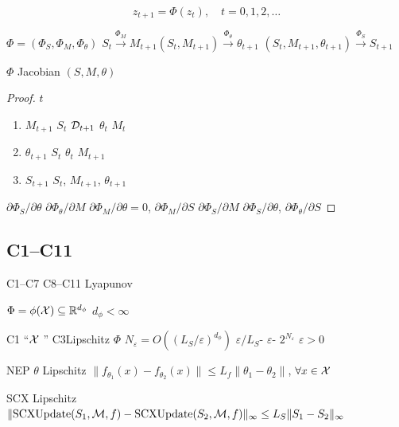 \begin{equation}\label{eq:dynamics}
    z_{t+1} = \Phi(z_t), \quad t = 0, 1, 2, \dots
\end{equation}

 $\Phi = (\Phi_S, \Phi_M, \Phi_\theta)$ 
$S_t \xrightarrow{\Phi_M} M_{t+1}$$(S_t, M_{t+1}) \xrightarrow{\Phi_\theta} \theta_{t+1}$ $(S_t, M_{t+1}, \theta_{t+1}) \xrightarrow{\Phi_S} S_{t+1}$

\begin{proposition}[ Jacobian]\label{prop:causal}
$\Phi$  Jacobian $(S, M, \theta)$ 
\end{proposition}

\begin{proof}
 $t$ 
\begin{enumerate}[nosep]
    \item $M_{t+1}$  $S_t$ $\mathcal{D}_{t+1}$ $\theta_t$  $M_t$ 
    \item $\theta_{t+1}$  $S_t$ $\theta_t$ $M_{t+1}$ 
    \item $S_{t+1}$  $S_t$, $M_{t+1}$,  $\theta_{t+1}$
\end{enumerate}
$\partial \Phi_S / \partial \theta$  $\partial \Phi_\theta / \partial M$  $\partial \Phi_M / \partial \theta = 0$, $\partial \Phi_M / \partial S$ $\partial \Phi_S / \partial M$  $\partial \Phi_S / \partial \theta$, $\partial \Phi_\theta / \partial S$ 
\end{proof}

\subsection{ C1--C11}

 C1--C7 C8--C11  Lyapunov 

\begin{assumption}[C1: ]\label{ass:c1}
 $\Phi = \phi(\mathcal{X}) \subseteq \mathbb{R}^{d_\phi}$  $d_\phi < \infty$
\end{assumption}

\textbf{}C1 ``$\mathcal{X}$ '' C3Lipschitz  $\Phi$  $N_\varepsilon = O((L_S/\varepsilon)^{d_\phi})$  $\varepsilon/L_S$- $\varepsilon$- $2^{N_\varepsilon}$ $\varepsilon > 0$ 

\begin{assumption}[C2: Lipschitz ]\label{ass:c2}
NEP  $\theta$ Lipschitz $\|f_{\theta_1}(x) - f_{\theta_2}(x)\| \leq L_f \|\theta_1 - \theta_2\|$, $\forall x \in \mathcal{X}$
\end{assumption}

\begin{assumption}[C3: Lipschitz ]\label{ass:c3}
SCX  Lipschitz $\|\text{SCXUpdate}(S_1, \mathcal{M}, f) - \text{SCXUpdate}(S_2, \mathcal{M}, f)\|_\infty \leq L_S \|S_1 - S_2\|_\infty$
\end{assumption}

